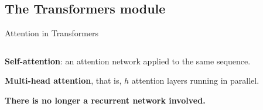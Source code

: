 \documentclass[9pt]{beamer}
\begin{document}
\subsection{The Transformers module}

\begin{frame}{Attention in Transformers}
\begin{columns}[onlytextwidth]
    \begin{column}{0.50\textwidth}
    \textbf{Self-attention}: an attention network applied to the same sequence.
    \vspace{0.15cm}
    
    \textbf{Multi-head attention}, that is, $h$ attention layers running in parallel.\vspace{0.15cm}
    
    \textbf{There is no longer a recurrent network involved.}\\
\end{column}
\end{columns}
\end{frame}
\end{document}
